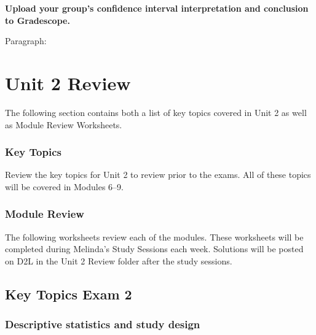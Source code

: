 \documentclass[
]{report}
\begin{document}
\textbf{Upload your group's confidence interval interpretation and conclusion to Gradescope.}

\newpage

Paragraph:

\newpage

\chapter{Unit 2 Review}\label{unit-2-review}

The following section contains both a list of key topics covered in Unit 2 as well as Module Review Worksheets.

\subsection{Key Topics}\label{key-topics-9}

Review the key topics for Unit 2 to review prior to the exams. All of these topics will be covered in Modules 6--9.

\subsection{Module Review}\label{module-review-1}


The following worksheets review each of the modules. These worksheets will be completed during Melinda's Study Sessions each week. Solutions will be posted on D2L in the Unit 2 Review folder after the study sessions.

\newpage

\section{Key Topics Exam 2}\label{key-topics-exam-2}

\subsection*{Descriptive statistics and study design}\label{descriptive-statistics-and-study-design-1}
\end{document}
